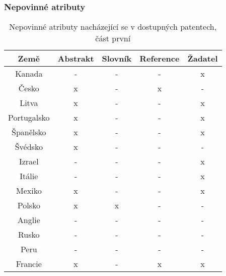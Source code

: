 \subsubsection{Nepovinné atributy}
	\begin{table}[H]
	\centering
	\begin{tabular}{|c|c|c|c|c|} 
	\hline
	\textbf{Země}    & \textbf{Abstrakt} & \textbf{Slovník} & \textbf{Reference} & \textbf{Žadatel} \\
	\hline
	Kanada & - & - & - & x \\
	\hline
	Česko & x & - & x & - \\
	\hline
	Litva & x & - & - & x \\
	\hline
	Portugalsko & x & - & - & x \\
	\hline
	Španělsko & x & - & - & x \\
	\hline
	Švédsko & x & - & - & - \\
	\hline
	Izrael & - & - & - & x \\
	\hline
	Itálie & - & - & - & x \\
	\hline
	Mexiko & x & - & - & x \\
	\hline
	Polsko & x & x & - & - \\
	\hline
	Anglie & - & - & - & - \\
	\hline
	Rusko & - & - & - & - \\
	\hline
	Peru & - & - & - & - \\
	\hline
	Francie & x & - & x & x \\
	\hline
	\end{tabular}
	\caption{Nepovinné atributy nacházející se v dostupných patentech, část první}
	\label{tab:table_attributes_notcrit1}
	\end{table}


